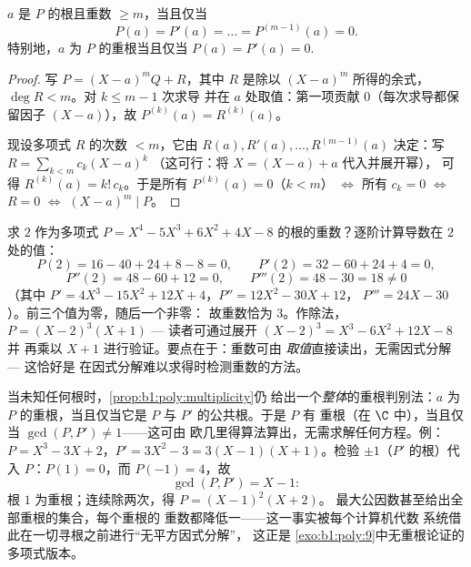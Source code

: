 \begin{proposition}[用导数刻画重数]\label{prop:b1:poly:multiplicity}
$a$ 是 $P$ 的根且重数 $\geq m$，当且仅当
\[
P(a) = P'(a) = \dots = P^{(m-1)}(a) = 0 .
\]
特别地，$a$ 为 $P$ 的重根当且仅当 $P(a) =
P'(a) = 0$.
\end{proposition}

\begin{proof}
写 $P = (X - a)^m Q + R$，其中 $R$ 是除以
$(X-a)^m$ 所得的余式，$\deg R < m$。对 $k \leq m - 1$ 次求导
并在 $a$ 处取值：第一项贡献 $0$（每次求导都保留因子
$(X-a)$），故 $P^{(k)}(a) = R^{(k)}(a)$。

现设多项式 $R$ 的次数 $< m$，它由 $R(a), R'(a),
\dots, R^{(m-1)}(a)$ 决定：写 $R = \sum_{k < m} c_k (X - a)^k$
（这可行：将 $X = (X - a) + a$ 代入并展开幂），
可得 $R^{(k)}(a) = k!\, c_k$。于是所有 $P^{(k)}(a) = 0$（$k < m$）
$\iff$ 所有 $c_k = 0$ $\iff$ $R = 0$ $\iff$ $(X-a)^m \mid P$。
\end{proof}

\begin{example}[计算重数]\label{ex:b1:poly:multexample}
求 $2$ 作为多项式 $P = X^4 - 5X^3 + 6X^2
+ 4X - 8$ 的根的重数？逐阶计算导数在 $2$ 处的值：
\[
P(2) = 16 - 40 + 24 + 8 - 8 = 0, \qquad
P'(2) = 32 - 60 + 24 + 4 = 0,
\]
\[
P''(2) = 48 - 60 + 12 = 0, \qquad
P'''(2) = 48 - 30 = 18 \neq 0
\]
（其中 $P' = 4X^3 - 15X^2 + 12X + 4$，$P'' = 12X^2 - 30X + 12$，
$P''' = 24X - 30$）。前三个值为零，随后一个非零：
故重数恰为 $3$。作除法，$P = (X - 2)^3(X + 1)$ ---
读者可通过展开 $(X-2)^3 = X^3 - 6X^2 + 12X - 8$ 并
再乘以 $X + 1$ 进行验证。要点在于：重数可由
\emph{取值}直接读出，无需因式分解 --- 这恰好是
在因式分解难以求得时检测重数的方法。
\end{example}

\begin{example}[用最大公因数检测重根]\label{ex:b1:poly:gcdmultiple}
当未知任何根时，\cref{prop:b1:poly:multiplicity}仍
给出一个\emph{整体}的重根判别法：$a$ 为
$P$ 的重根，当且仅当它是 $P$ 与 $P'$ 的公共根。于是 $P$ 有
重根（在 $\C$ 中），当且仅当 $\gcd(P, P') \neq 1$——这可由
欧几里得算法算出，无需求解任何方程。例：$P =
X^3 - 3X + 2$，$P' = 3X^2 - 3 = 3(X - 1)(X + 1)$。检验
$\pm1$（$P'$ 的根）代入 $P$：$P(1) = 0$，而 $P(-1) = 4$，故
\[
\gcd(P, P') = X - 1 :
\]
根 $1$ 为重根；连续除两次，得 $P = (X - 1)^2(X + 2)$。
最大公因数甚至给出全部重根的集合，每个重根的
重数都降低一——这一事实被每个计算机代数
系统借此在一切寻根之前进行“无平方因式分解”，
这正是
\cref{exo:b1:poly:9}中无重根论证的多项式版本。
\end{example}

